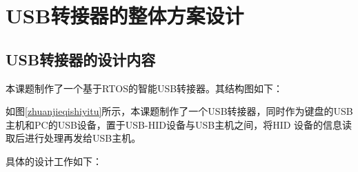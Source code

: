 
\chapter{USB转接器的整体方案设计}

\section{USB转接器的设计内容}
本课题制作了一个基于RTOS的智能USB转接器。其结构图如下：


如图\ref{zhuanjieqishiyitu}所示，本课题制作了一个USB转接器，同时作为键盘的USB主机和PC的USB设备，置于USB-HID设备与USB主机之间，将HID 设备的信息读取后进行处理再发给USB主机。

具体的设计工作如下：

